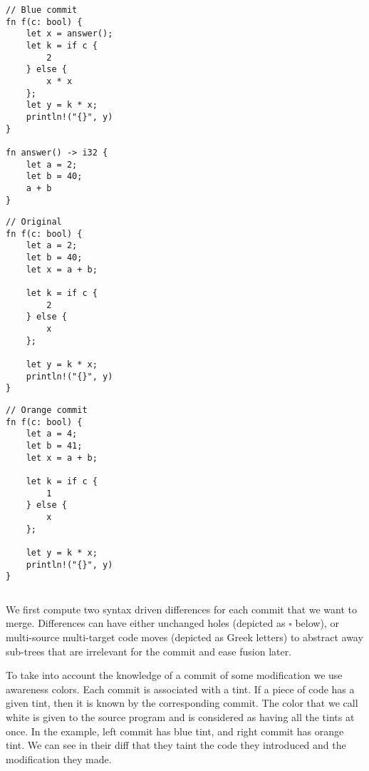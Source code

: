 \documentclass[a4paper,10pt]{article}
\begin{document}
\noindent
\begin{minipage}{.32\textwidth}
\begin{lstlisting}[rulecolor=\color{blue!20}]
// Blue commit
fn f(c: bool) {
    let x = answer();
    let k = if c {
        2
    } else {
        x * x
    };
    let y = k * x;
    println!("{}", y)
}

fn answer() -> i32 {
    let a = 2;
    let b = 40;
    a + b
}
\end{lstlisting}
\end{minipage}\hfill
\begin{minipage}{.32\textwidth}
\begin{lstlisting}
// Original
fn f(c: bool) {
    let a = 2;
    let b = 40;
    let x = a + b;

    let k = if c {
        2
    } else {
        x
    };

    let y = k * x;
    println!("{}", y)
}
\end{lstlisting}
\end{minipage}\hfill
\begin{minipage}{.32\textwidth}
\begin{lstlisting}[rulecolor=\color{orange!30}]
// Orange commit
fn f(c: bool) {
    let a = 4;
    let b = 41;
    let x = a + b;

    let k = if c {
        1
    } else {
        x
    };

    let y = k * x;
    println!("{}", y)
}
\end{lstlisting}
\end{minipage}
\vspace{-.4cm}
\begin{lstlisting}[label=lst:overview_commits, caption={A source code and two concurrent commits on it}]
\end{lstlisting}

We first compute two syntax driven differences for each commit that we want to merge. Differences can have either unchanged holes (depicted as $\square$ below), or multi-source multi-target code moves (depicted as Greek letters) to abstract away sub-trees that are irrelevant for the commit and ease fusion later.

To take into account the knowledge of a commit of some modification we use awareness colors. Each commit is associated with a tint. If a piece of code has a given tint, then it is known by the corresponding commit. The color that we call white is given to the source program and is considered as having all the tints at once. In the example, left commit has blue tint, and right commit has orange tint. We can see in their diff that they taint the code they introduced and the modification they made.
\end{document}

